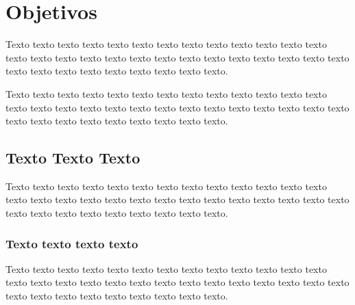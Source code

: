 \section{Objetivos}
\label{objetivos}
Texto texto texto texto texto texto texto texto texto texto texto texto texto texto texto texto texto texto texto texto texto texto texto texto texto texto texto texto texto texto texto texto texto texto texto texto.

Texto texto texto texto texto texto texto texto texto texto texto texto texto texto texto texto texto texto texto texto texto texto texto texto texto texto texto texto texto texto texto texto texto texto texto texto.

\subsection{Texto Texto Texto}
\label{sub:exemplonivel3}

Texto texto texto texto texto texto texto texto texto texto texto texto texto texto texto texto texto texto texto texto texto texto texto texto texto texto texto texto texto texto texto texto texto texto texto texto.

\subsubsection{Texto texto texto texto}
\label{subsub:exemplonivel4}

Texto texto texto texto texto texto texto texto texto texto texto texto texto texto texto texto texto texto texto texto texto texto texto texto texto texto texto texto texto texto texto texto texto texto texto texto.